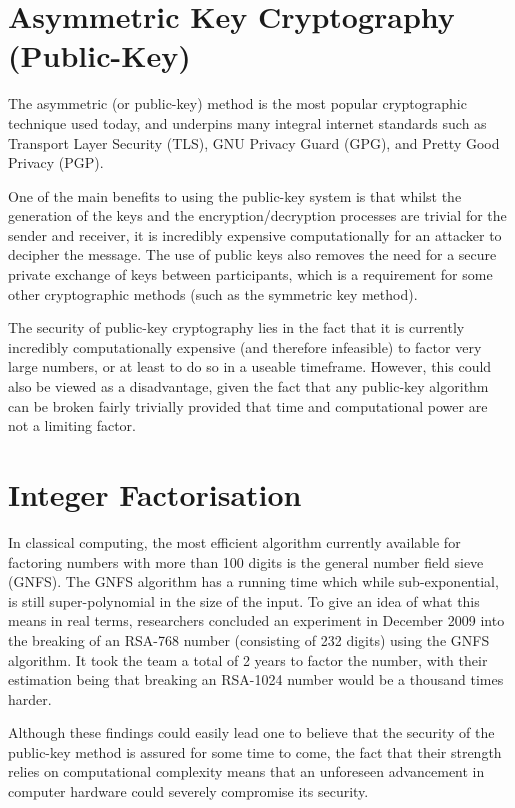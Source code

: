 \documentclass[runningheads,a4paper]{llncs}
\begin{document}
\section{Asymmetric Key Cryptography (Public-Key)} 

The asymmetric (or public-key) method is the most popular cryptographic technique used today, and underpins many integral internet standards such as Transport Layer Security (TLS), GNU Privacy Guard (GPG), and Pretty Good Privacy (PGP).

One of the main benefits to using the public-key system is that whilst the generation of the keys and the encryption/decryption processes are trivial for the sender and receiver, it is incredibly expensive computationally for an attacker to decipher the message. The use of public keys also removes the need for a secure private exchange of keys between participants, which is a requirement for some other cryptographic methods (such as the symmetric key method).

The security of public-key cryptography lies in the fact that it is currently incredibly computationally expensive (and therefore infeasible) to factor very large numbers, or at least to do so in a useable timeframe. However, this could also be viewed as a disadvantage, given the fact that any public-key algorithm can be broken fairly trivially provided that time and computational power are not a limiting factor.

\section{Integer Factorisation}

In classical computing, the most efficient algorithm currently available for factoring numbers with more than 100 digits is the general number field sieve (GNFS). The GNFS algorithm has a running time which while sub-exponential, is still super-polynomial in the size of the input. To give an idea of what this means in real terms, researchers concluded an experiment in December 2009 into the breaking of an RSA-768 number (consisting of 232 digits) using the GNFS algorithm. It took the team a total of 2 years to factor the number, with their estimation being that breaking an RSA-1024 number would be a thousand times harder\cite{Kleinjung:2010:FRM:1881412.1881436}. 

Although these findings could easily lead one to believe that the security of the public-key method is assured for some time to come, the fact that their strength relies on computational complexity means that an unforeseen advancement in  computer hardware could severely compromise its security.
\end{document}
